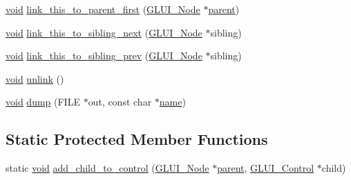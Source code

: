 \begin{DoxyCompactItemize}
\hyperlink{wglext_8h_a9e6b7f1933461ef318bb000d6bd13b83}{void} \hyperlink{class_g_l_u_i___node_a3feadb4b6d58122ff5449adfb4a323bc}{link\+\_\+this\+\_\+to\+\_\+parent\+\_\+first} (\hyperlink{class_g_l_u_i___node}{G\+L\+U\+I\+\_\+\+Node} $\ast$\hyperlink{class_g_l_u_i___node_a8ed65d447784f6f88bd3e2e2bcac6cdb}{parent})
\item 
\hyperlink{wglext_8h_a9e6b7f1933461ef318bb000d6bd13b83}{void} \hyperlink{class_g_l_u_i___node_ad8d7fd8a437eeec4a72b73064dc954b4}{link\+\_\+this\+\_\+to\+\_\+sibling\+\_\+next} (\hyperlink{class_g_l_u_i___node}{G\+L\+U\+I\+\_\+\+Node} $\ast$sibling)
\item 
\hyperlink{wglext_8h_a9e6b7f1933461ef318bb000d6bd13b83}{void} \hyperlink{class_g_l_u_i___node_a5825555fc493712a1d6f24235f59f25a}{link\+\_\+this\+\_\+to\+\_\+sibling\+\_\+prev} (\hyperlink{class_g_l_u_i___node}{G\+L\+U\+I\+\_\+\+Node} $\ast$sibling)
\item 
\hyperlink{wglext_8h_a9e6b7f1933461ef318bb000d6bd13b83}{void} \hyperlink{class_g_l_u_i___node_a48b62b12bf8c466fc54fbbbf30183493}{unlink} ()
\item 
\hyperlink{wglext_8h_a9e6b7f1933461ef318bb000d6bd13b83}{void} \hyperlink{class_g_l_u_i___node_abce29cf0ade68e9e5702025f710cb1e8}{dump} (F\+I\+L\+E $\ast$out, const char $\ast$\hyperlink{glext_8h_ad977737dfc9a274a62741b9500c49a32}{name})
\end{DoxyCompactItemize}
\subsection*{Static Protected Member Functions}
\begin{DoxyCompactItemize}
\item 
static \hyperlink{wglext_8h_a9e6b7f1933461ef318bb000d6bd13b83}{void} \hyperlink{class_g_l_u_i___node_a02cf295c81cebe31c39e95403dbadbc1}{add\+\_\+child\+\_\+to\+\_\+control} (\hyperlink{class_g_l_u_i___node}{G\+L\+U\+I\+\_\+\+Node} $\ast$\hyperlink{class_g_l_u_i___node_a8ed65d447784f6f88bd3e2e2bcac6cdb}{parent}, \hyperlink{class_g_l_u_i___control}{G\+L\+U\+I\+\_\+\+Control} $\ast$child)
\end{DoxyCompactItemize}
